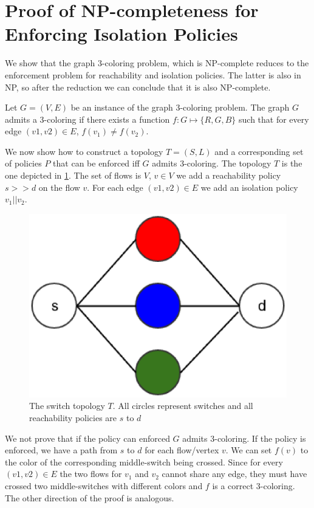  \appendix
 \section{Proof of NP-completeness for Enforcing Isolation Policies} \label{sec:isolationNP}
 We show that the graph 3-coloring problem, which is NP-complete reduces to the enforcement problem for
 reachability and isolation policies. The latter is also in NP, so after the reduction we 
 can conclude that it is also NP-complete.

Let $G=(V,E)$ be an instance of the graph 3-coloring problem.
The graph $G$ admits a 3-coloring if there exists a function 
$f:G\mapsto \{R,G,B\}$ such that for every edge $(v1,v2)\in E$,
$f(v_1)\neq f(v_2)$.

We now show how to construct a topology $T=(S,L)$ and a corresponding set of policies $P$ that can be 
enforced iff $G$ admits 3-coloring.
The topology $T$ is the one depicted in  \cref{fig:swtopo}.
The set of flows is $V$, $v \in V$ we add a reachability policy $s >> d$ on the flow $v$.
For each edge $(v1,v2)\in E$ we add an isolation policy $v_1||v_2$.
 \begin{figure}[H] 
 	\centering
 	\includegraphics[width=0.7\columnwidth]{figures/color_topo.eps}
 	\caption{The switch topology $T$. All circles represent switches and all reachability policies are $s$ to $d$}
 	\label{fig:swtopo}
 \end{figure}
We not prove that if the policy can enforced $G$ admits 3-coloring.
If the policy is enforced, we have a path from $s$ to $d$ for each flow/vertex $v$.
We can set $f(v)$ to the color of the corresponding middle-switch being crossed.
Since for every $(v1,v2)\in E$ the two flows for $v_1$ and $v_2$ cannot share any edge,
they must have crossed two middle-switches with different colors and $f$ is a correct 3-coloring.
The other direction of the proof is analogous.

